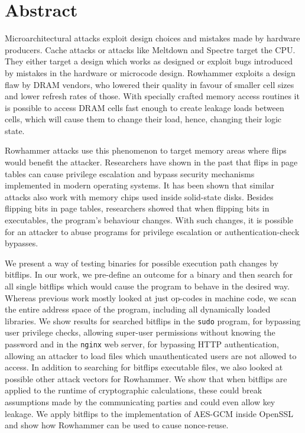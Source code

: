 
{}
\chapter*{Abstract}
\label{cha:abstract}

Microarchitectural attacks exploit design choices and mistakes made by hardware
producers. Cache attacks or attacks like Meltdown and Spectre target the CPU.
They either target a design which works as designed or exploit bugs introduced
by mistakes in the hardware or microcode design. Rowhammer exploits a design
flaw by DRAM vendors, who lowered their quality in favour of smaller cell sizes
and lower refresh rates of those. With specially crafted memory access routines
it is possible to access DRAM cells fast enough to create leakage loads between
cells, which will cause them to change their load, hence, changing their logic
state.

Rowhammer attacks use this phenomenon to target memory areas where flips would
benefit the attacker. Researchers have shown in the past that flips in page
tables can cause privilege escalation and bypass security mechanisms implemented
in modern operating systems. It has been shown that similar attacks also work
with memory chips used inside solid-state disks. Besides flipping bits in page
tables, researchers showed that when flipping bits in executables, the program's
behaviour changes. With such changes, it is possible for an attacker to abuse
programs for privilege escalation or authentication-check bypasses.

We present a way of testing binaries for possible execution path changes by
bitflips. In our work, we pre-define an outcome for a binary and then search for
all single bitflips which would cause the program to behave in the desired way.
Whereas previous work mostly looked at just op-codes in machine code, we scan
the entire address space of the program, including all dynamically loaded
libraries. We show results for searched bitflips in the \texttt{sudo} program,
for bypassing user privilege checks, allowing super-user permissions without
knowing the password and in the \texttt{nginx} web server, for bypassing HTTP
authentication, allowing an attacker to load files which unauthenticated users
are not allowed to access. In addition to searching for bitflips executable
files, we also looked at possible other attack vectors for Rowhammer. We show
that when bitflips are applied to the runtime of cryptographic calculations,
these could break assumptions made by the communicating parties and could even
allow key leakage. We apply bitflips to the implementation of AES-GCM inside
OpenSSL and show how Rowhammer can be used to cause nonce-reuse.

